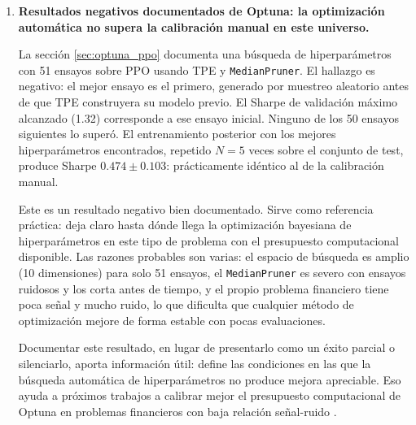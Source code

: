 \documentclass[IB,a4paper]{TFUOC}
\begin{document}
\begin{enumerate}
    La corrección consiste en restringir el \textit{screener} a datos estrictamente anteriores al inicio del test (cutoff 2024-03-08). Este procedimiento, conocido en la literatura como \textit{honest backtesting} o validación \textit{out-of-sample} estricta \citep{lopezdeprado2018}, produce un universo de $n=17$ activos (APP, BND, CEG, COR, COST, GE, IVV, LLY, META, NVDA, PHM, RSG, SMCI, VRT, VST, IBIT, ETHA) sin solapamiento temporal entre el criterio de selección y el periodo de evaluación. Todos los resultados del capítulo \ref{cap:resultados} y de esta sección de conclusiones se basan en este universo corregido.

    El efecto cuantitativo de la corrección es sustancial. El Sharpe del PPO Optuna cae de $1.875$ (universo inicial con sesgo de selección, única semilla) a $0.474 \pm 0.103$ (universo corregido sin sesgo de selección, media sobre $N=5$ semillas). Esta caída no significa que el agente haya empeorado: significa que las métricas anteriores estaban infladas por el \textit{leakage}. Los valores del universo sin sesgo de selección son los académicamente correctos.

    \item \textbf{Resultados negativos documentados de Optuna: la optimización automática no supera la calibración manual en este universo.}

    La sección \ref{sec:optuna_ppo} documenta una búsqueda de hiperparámetros con 51 ensayos sobre PPO usando TPE \citep{bergstra2011tpe} y \texttt{MedianPruner}. El hallazgo es negativo: el mejor ensayo es el primero, generado por muestreo aleatorio antes de que TPE construyera su modelo previo. El Sharpe de validación máximo alcanzado (1.32) corresponde a ese ensayo inicial. Ninguno de los 50 ensayos siguientes lo superó. El entrenamiento posterior con los mejores hiperparámetros encontrados, repetido $N=5$ veces sobre el conjunto de test, produce Sharpe $0.474 \pm 0.103$: prácticamente idéntico al de la calibración manual.

    Este es un resultado negativo bien documentado. Sirve como referencia práctica: deja claro hasta dónde llega la optimización bayesiana de hiperparámetros en este tipo de problema con el presupuesto computacional disponible. Las razones probables son varias: el espacio de búsqueda es amplio (10 dimensiones) para solo 51 ensayos, el \texttt{MedianPruner} es severo con ensayos ruidosos y los corta antes de tiempo, y el propio problema financiero tiene poca señal y mucho ruido, lo que dificulta que cualquier método de optimización mejore de forma estable con pocas evaluaciones.

    Documentar este resultado, en lugar de presentarlo como un éxito parcial o silenciarlo, aporta información útil: define las condiciones en las que la búsqueda automática de hiperparámetros no produce mejora apreciable. Eso ayuda a próximos trabajos a calibrar mejor el presupuesto computacional de Optuna en problemas financieros con baja relación señal-ruido \citep{akiba2019optuna}.
\end{enumerate}
\end{document}
